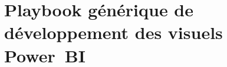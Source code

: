 
\chapter{Playbook générique de développement des visuels Power~BI}
\label{chap:playbook}
\setlength{\parindent}{0pt}





















